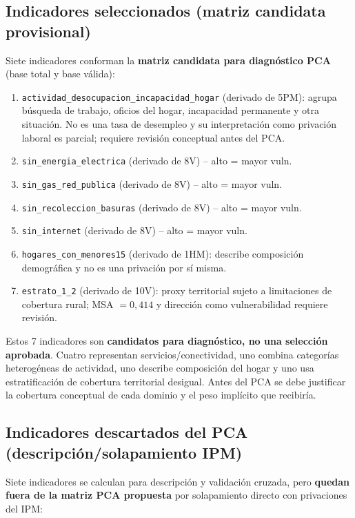 \subsection{Indicadores seleccionados (matriz candidata provisional)}
\label{sec:indicadores_seleccionados}

Siete indicadores conforman la \textbf{matriz candidata para diagnóstico PCA} (base total y base válida):

\begin{enumerate}
    \item \texttt{actividad\_desocupacion\_incapacidad\_hogar} (derivado de 5PM): agrupa búsqueda de trabajo, oficios del hogar, incapacidad permanente y otra situación. No es una tasa de desempleo y su interpretación como privación laboral es parcial; requiere revisión conceptual antes del PCA.
    \item \texttt{sin\_energia\_electrica} (derivado de 8V) -- alto = mayor vuln.
    \item \texttt{sin\_gas\_red\_publica} (derivado de 8V) -- alto = mayor vuln.
    \item \texttt{sin\_recoleccion\_basuras} (derivado de 8V) -- alto = mayor vuln.
    \item \texttt{sin\_internet} (derivado de 8V) -- alto = mayor vuln.
    \item \texttt{hogares\_con\_menores15} (derivado de 1HM): describe composición demográfica y no es una privación por sí misma.
    \item \texttt{estrato\_1\_2} (derivado de 10V): proxy territorial sujeto a limitaciones de cobertura rural; MSA $=0,414$ y dirección como vulnerabilidad requiere revisión.
\end{enumerate}

Estos 7 indicadores son \textbf{candidatos para diagnóstico, no una selección aprobada}. Cuatro representan servicios/conectividad, uno combina categorías heterogéneas de actividad, uno describe composición del hogar y uno usa estratificación de cobertura territorial desigual. Antes del PCA se debe justificar la cobertura conceptual de cada dominio y el peso implícito que recibiría.

\subsection{Indicadores descartados del PCA (descripción/solapamiento IPM)}
\label{sec:indicadores_descartados}

Siete indicadores se calculan para descripción y validación cruzada, pero \textbf{quedan fuera de la matriz PCA propuesta} por solapamiento directo con privaciones del IPM:

